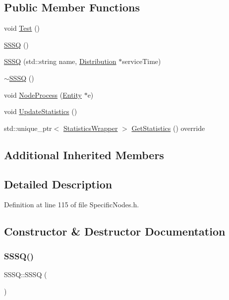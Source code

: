 \subsection*{Public Member Functions}
\begin{DoxyCompactItemize}
\item 
void \hyperlink{class_s_s_s_q_aad6abb8c7afcca47a7b567f9adfbf032}{Test} ()
\item 
\hyperlink{class_s_s_s_q_a03276f98400682df04d5a770f6615733}{S\+S\+SQ} ()
\item 
\hyperlink{class_s_s_s_q_ab654407f52271f87971b0642dd61a543}{S\+S\+SQ} (std\+::string name, \hyperlink{class_distribution}{Distribution} $\ast$service\+Time)
\item 
\hyperlink{class_s_s_s_q_a6316b4f5b481609f244022cd83ef67bb}{$\sim$\+S\+S\+SQ} ()
\item 
void \hyperlink{class_s_s_s_q_a21ff1a4817052985747b6df51bf5d643}{Node\+Process} (\hyperlink{class_entity}{Entity} $\ast$e)
\item 
void \hyperlink{class_s_s_s_q_a8d3666772548e12aa39484d22ab5635c}{Update\+Statistics} ()
\item 
std\+::unique\+\_\+ptr$<$ \hyperlink{class_generic_node_1_1_statistics_wrapper}{Statistics\+Wrapper} $>$ \hyperlink{class_s_s_s_q_ad8f307b8a4609d28efcc122dddfe5120}{Get\+Statistics} () override
\end{DoxyCompactItemize}
\subsection*{Additional Inherited Members}


\subsection{Detailed Description}


Definition at line 115 of file Specific\+Nodes.\+h.



\subsection{Constructor \& Destructor Documentation}
\mbox{\label{class_s_s_s_q_a03276f98400682df04d5a770f6615733}} 
\subsubsection{\texorpdfstring{S\+S\+S\+Q()}{SSSQ()}\hspace{0.1cm}{\footnotesize\ttfamily [1/2]}}
{\footnotesize\ttfamily S\+S\+S\+Q\+::\+S\+S\+SQ (\begin{DoxyParamCaption}{ }\end{DoxyParamCaption})}



